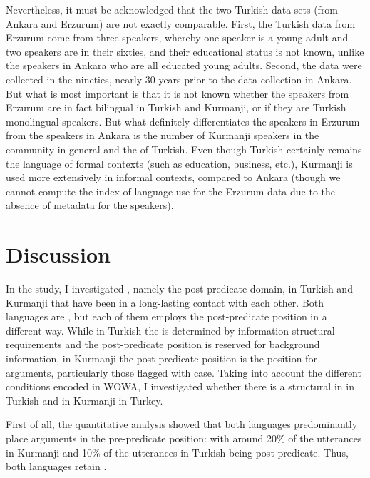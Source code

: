 \documentclass[output=paper,colorlinks,citecolor=brown]{langscibook}
\begin{document}
Nevertheless, it must be acknowledged that the two Turkish data sets (from Ankara and Erzurum) are not exactly comparable. First, the Turkish data from Erzurum come from three speakers, whereby one speaker is a young adult and two speakers are in their sixties, and their educational status is not known, unlike the speakers in Ankara who are all educated young adults. Second, the data were collected in the nineties, nearly 30 years prior to the data collection in Ankara. But what is most important is that it is not known whether the speakers from Erzurum are in fact bilingual in Turkish and Kurmanji, or if they are Turkish monolingual speakers. But what definitely differentiates the speakers in Erzurum from the speakers in Ankara is the number of Kurmanji speakers in the community in general and the  of Turkish. Even though Turkish certainly remains the language of formal contexts (such as education, business, etc.), Kurmanji is used more extensively in informal contexts, compared to Ankara (though we cannot compute the index of language use for the Erzurum data due to the absence of metadata for the speakers). 

\section{Discussion}\label{Bilingual:ss:7}

In the study, I investigated , namely the post-predicate domain, in Turkish and Kurmanji that have been in a long-lasting contact with each other. Both languages are , but each of them employs the post-predicate position in a different way. While in Turkish the  is determined by information structural requirements and the post-predicate position is reserved for background information, in Kurmanji the post-predicate position is the position for  arguments, particularly those flagged with case. Taking into account the different conditions encoded in WOWA, I investigated whether there is a structural  in  in Turkish and in Kurmanji in Turkey.

First of all, the quantitative analysis showed that both languages predominantly place arguments in the pre-predicate position: with around 20\% of the utterances in Kurmanji and 10\% of the utterances in Turkish being post-predicate. Thus, both languages retain  . 
\end{document}

